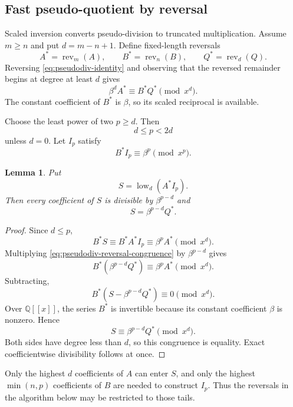 \documentclass[11pt]{book}
\newtheorem{lemma}[theorem]{Lemma}
\theoremstyle{definition}
\begin{document}
\subsection{Fast pseudo-quotient by reversal}

Scaled inversion converts pseudo-division to truncated multiplication.  Assume
$m\ge n$ and put $d=m-n+1$.  Define fixed-length reversals
\[
 A^*=\operatorname{rev}_m(A),
 \qquad
 B^*=\operatorname{rev}_n(B),
 \qquad
 Q^*=\operatorname{rev}_d(Q).
\]
Reversing \eqref{eq:pseudodiv-identity} and observing that the reversed
remainder begins at degree at least $d$ gives
\begin{equation}\label{eq:pseudodiv-reversal-congruence}
 \beta^d A^*\equiv B^*Q^*\pmod{x^d}.
\end{equation}
The constant coefficient of $B^*$ is $\beta$, so its scaled reciprocal is
available.

Choose the least power of two $p\ge d$.  Then
\begin{equation}\label{eq:pseudodiv-p-range}
 d\le p<2d
\end{equation}
unless $d=0$.  Let $I_p$ satisfy
\[
 B^*I_p\equiv\beta^p\pmod{x^p}.
\]

\begin{lemma}\label{lem:fast-pseudoquotient}
Put
\[
 S=\operatorname{low}_d(A^*I_p).
\]
Then every coefficient of $S$ is divisible by $\beta^{p-d}$ and
\begin{equation}\label{eq:fast-pseudoquotient-scale}
 S=\beta^{p-d}Q^*.
\end{equation}
\end{lemma}

\begin{proof}
Since $d\le p$,
\[
 B^*S
 \equiv B^*A^*I_p
 \equiv \beta^p A^*
 \pmod{x^d}.
\]
Multiplying \eqref{eq:pseudodiv-reversal-congruence} by
$\beta^{p-d}$ gives
\[
 B^*(\beta^{p-d}Q^*)
 \equiv\beta^pA^*\pmod{x^d}.
\]
Subtracting,
\[
 B^*(S-\beta^{p-d}Q^*)\equiv0\pmod{x^d}.
\]
Over $\mathbb Q[[x]]$, the series $B^*$ is invertible because its constant
coefficient $\beta$ is nonzero.  Hence
\[
 S\equiv\beta^{p-d}Q^*\pmod{x^d}.
\]
Both sides have degree less than $d$, so this congruence is equality.  Exact
coefficientwise divisibility follows at once.
\end{proof}

Only the highest $d$ coefficients of $A$ can enter $S$, and only the highest
$\min(n,p)$ coefficients of $B$ are needed to construct $I_p$.  Thus the
reversals in the algorithm below may be restricted to those tails.
\end{document}
